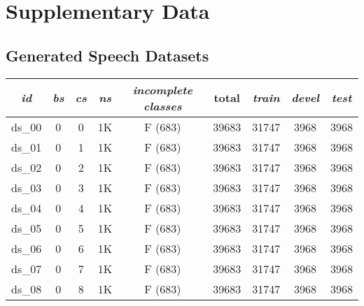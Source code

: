 \chapter{Supplementary Data} \label{app:supplementary_data}

\section*{Generated Speech Datasets} \label{app:sec:generated_speech_datasets}

\begin{footnotesize}
\begin{longtable}{|c|c|c|c|c|c|c|c|c|}
\hline
\textit{id} & \textit{bs} & \textit{cs} & \textit{ns} & \textit{incomplete classes} & total & \textit{train} & \textit{devel} & \textit{test} \\ \hline
\endhead
ds\_00      & 0           & 0           & 1K        & F (683)                     & 39683         & 31747          & 3968           & 3968          \\ \hline
ds\_01      & 0           & 1           & 1K        & F (683)                     & 39683         & 31747          & 3968           & 3968          \\ \hline
ds\_02      & 0           & 2           & 1K        & F (683)                     & 39683         & 31747          & 3968           & 3968          \\ \hline
ds\_03      & 0           & 3           & 1K        & F (683)                     & 39683         & 31747          & 3968           & 3968          \\ \hline
ds\_04      & 0           & 4           & 1K        & F (683)                     & 39683         & 31747          & 3968           & 3968          \\ \hline
ds\_05      & 0           & 5           & 1K        & F (683)                     & 39683         & 31747          & 3968           & 3968          \\ \hline
ds\_06      & 0           & 6           & 1K        & F (683)                     & 39683         & 31747          & 3968           & 3968          \\ \hline
ds\_07      & 0           & 7           & 1K        & F (683)                     & 39683         & 31747          & 3968           & 3968          \\ \hline
ds\_08      & 0           & 8           & 1K        & F (683)                     & 39683         & 31747          & 3968           & 3968          \\ \hline

\end{longtable}
\end{footnotesize}
